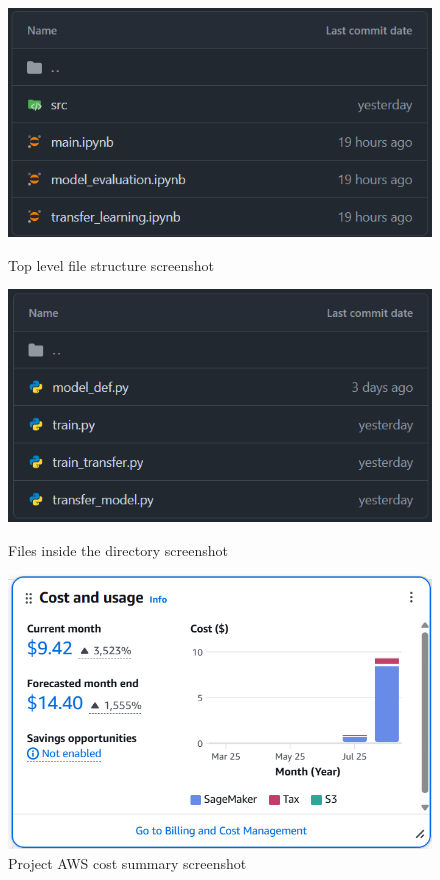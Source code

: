 \begin{figure}[htbp]
    \centering
    \begin{minipage}{0.3\textwidth}
        \centering
        \includegraphics[width=\linewidth]{figures/file_structure_top.png}
        \caption{Top level file structure screenshot}
        \label{fig:file_top}
    \end{minipage}\hfill
    \begin{minipage}{0.3\textwidth}
        \centering
        \includegraphics[width=\linewidth]{figures/file_structure_src.png}
        \caption{Files inside the  directory screenshot}
        \label{fig:file_src}
    \end{minipage}\hfill
    \begin{minipage}{0.35\textwidth}
        \centering
        \includegraphics[width=\linewidth]{figures/aws_cost_summary.png} %
        \caption{Project AWS cost summary screenshot} %
        \label{fig:aws_cost_summary} %
    \end{minipage}\hfill
\end{figure}


